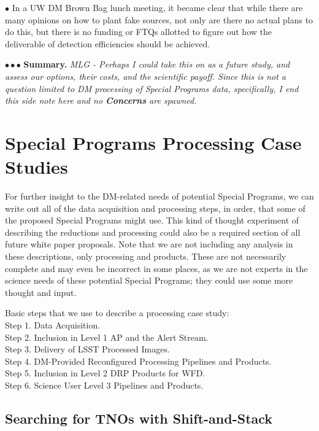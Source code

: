 \documentclass[DM,lsstdraft,toc]{lsstdoc}
\begin{document}
$\bullet$ In a UW DM Brown Bag lunch meeting, it became clear that while there are many opinions on how to plant fake sources, not only are there no actual plans to do this, but there is no funding or FTQs allotted to figure out how the deliverable of detection efficiencies should be achieved.

$\bullet \bullet \bullet$ {\bf Summary.} {\it MLG - Perhaps I could take this on as a future study, and assess our options, their costs, and the scientific payoff. Since this is not a question limited to DM processing of Special Programs data, specifically, I end this side note here and no {\bf Concerns} are spawned.}






\clearpage
\section{Special Programs Processing Case Studies}\label{sec:SPCS}

For further insight to the DM-related needs of potential Special Programs, we can write out all of the data acquisition and processing steps, in order, that some of the proposed Special Programs might use. This kind of thought experiment of describing the reductions and processing could also be a required section of all future white paper proposals. Note that we are not including any analysis in these descriptions, only processing and products. These are not necessarily complete and may even be incorrect in some places, as we are not experts in the science needs of these potential Special Programs; they could use some more thought and input.

Basic steps that we use to describe a processing case study: \\
Step 1. Data Acquisition. \\
Step 2. Inclusion in Level 1 AP and the Alert Stream. \\
Step 3. Delivery of LSST Processed Images. \\
Step 4. DM-Provided Reconfigured Processing Pipelines and Products. \\
Step 5. Inclusion in Level 2 DRP Products for WFD. \\
Step 6. Science User Level 3 Pipelines and Products. \\


\subsection{Searching for TNOs with Shift-and-Stack}\label{ssec:SPCS_TNO}
\end{document}
